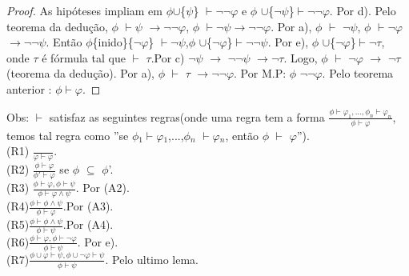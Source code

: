 \documentclass[12pt]{report}
\begin{document}
\begin{proof} As hipóteses impliam em $\phi$$\cup$\{$\psi$\} $\vdash$$\neg$$\neg$$\varphi$ e $\phi$ $\cup$\{$\neg$$\psi$\}$\vdash$$\neg$$\neg$$\varphi$. Por d). Pelo teorema da dedução, $\phi$ $\vdash$$\psi$ $\rightarrow$$\neg$$\neg$$\varphi$, $\phi$ $\vdash$$\neg$$\psi$$\rightarrow$$\neg$$\neg$$\varphi$. Por a), $\phi$ $\vdash$ $\neg$$\psi$, $\phi$ $\vdash$$\neg$$\varphi$$\rightarrow$$\neg$$\neg$$\psi$. Então  $\phi$\{inido\}\{$\neg$$\varphi$\} $\vdash$$\neg$$\psi$,$\phi$ $\cup$\{$\neg$$\varphi$\}$\vdash$$\neg$$\neg$$\psi$. Por e), $\phi$ $\cup$\{$\neg$$\varphi$\}$\vdash$$\neg$$\tau$, onde $\tau$ é fórmula tal que $\vdash$ $\tau$.Por c) $\neg$$\psi$ $\rightarrow$ $\neg$$\neg$$\psi$ $\rightarrow$$\neg$$\tau$. Logo, $\phi$ $\vdash$ $\neg$$\varphi$ $\rightarrow$ $\neg$$\tau$(teorema da dedução). Por a), $\phi$  $\vdash$ $\tau$ $\rightarrow$$\neg$$\neg$$\varphi$. Por M.P: $\phi$ $\neg$$\neg$$\varphi$. Pelo teorema anterior : $\phi$$\vdash$$\varphi$.\end{proof}
Obs: $\vdash$ satisfaz as seguintes regras(onde uma regra tem a forma $ \frac {\phi \vdash \varphi_{1},...,\phi_{n} \vdash \varphi_{n}}{\phi\vdash\varphi}$, temos tal regra como ''se $\phi$$_{1}$$\vdash$$\varphi$$_{1}$,...,$\phi$$_{n}$ $\vdash$$\varphi$$_{n}$, então $\phi$ $\vdash$ $\varphi$'').\\
(R1) $\frac{}{\varphi\vdash\varphi}$.\\
(R2) $\frac{\phi \vdash \varphi}{\phi'\vdash \varphi}$ se $\phi$ $\subseteq$ $\phi$'.\\
(R3) $ \frac{\phi \vdash \varphi,\phi \vdash \psi}{\phi \vdash \varphi \land\psi}$. Por (A2).\\
(R4)$ \frac {\phi \vdash \phi \land \psi}{\phi \vdash \varphi}$.Por (A3).\\
(R5)$ \frac {\phi \vdash \phi \land \psi}{\phi\vdash \psi }$.Por (A4).\\
(R6)$ \frac {\phi \vdash \varphi, \phi \vdash \neg \varphi}{\phi \vdash \psi }$. Por e).\\
(R7)$ \frac {\phi \cup {\varphi} \vdash \psi,\phi \cup {\neg\varphi} \vdash \psi}{\phi \vdash \psi}$. Pelo ultimo lema.\\
\end{document}
